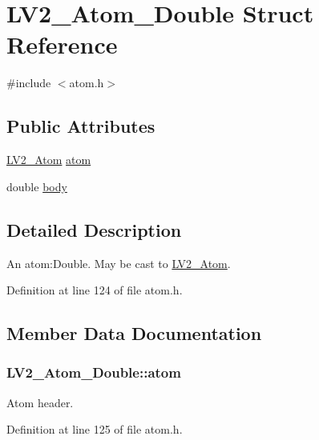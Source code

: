 \hypertarget{struct_l_v2___atom___double}{}\section{L\+V2\+\_\+\+Atom\+\_\+\+Double Struct Reference}
\label{struct_l_v2___atom___double}


{\ttfamily \#include $<$atom.\+h$>$}

\subsection*{Public Attributes}
\begin{DoxyCompactItemize}
\item 
\hyperlink{struct_l_v2___atom}{L\+V2\+\_\+\+Atom} \hyperlink{struct_l_v2___atom___double_a95acf11686342f970023e7fb0018f083}{atom}
\item 
double \hyperlink{struct_l_v2___atom___double_a5db15f75b7e939fa413843f99664e3ee}{body}
\end{DoxyCompactItemize}


\subsection{Detailed Description}
An atom\+:Double. May be cast to \hyperlink{struct_l_v2___atom}{L\+V2\+\_\+\+Atom}. 

Definition at line 124 of file atom.\+h.



\subsection{Member Data Documentation}
\subsubsection[{\texorpdfstring{atom}{atom}}]{ L\+V2\+\_\+\+Atom\+\_\+\+Double\+::atom}\hypertarget{struct_l_v2___atom___double_a95acf11686342f970023e7fb0018f083}{}\label{struct_l_v2___atom___double_a95acf11686342f970023e7fb0018f083}
Atom header. 

Definition at line 125 of file atom.\+h.

